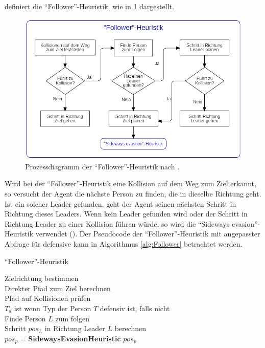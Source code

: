 \cite{Seitz.2016} definiert die "`Follower"'-Heuristik, wie in \figurename \ref{fig:followerHeuristik} dargestellt.
\begin{figure}[H]
	\centering
		\includegraphics[width=1.0\textwidth]{pictures/model/algorithm/heuristics/follower_heuristic.png}
	\caption{Prozessdiagramm der "`Follower"'-Heuristik nach \cite{Seitz.2016}.}
	\label{fig:followerHeuristik}
\end{figure}
Wird bei der "`Follower"'-Heuristik eine Kollision auf dem Weg zum Ziel erkannt, so versucht der Agent die nächste Person zu finden, die in dieselbe Richtung geht. Ist ein solcher Leader gefunden, geht der Agent seinen nächsten Schritt in Richtung dieses Leaders. Wenn kein Leader gefunden wird oder der Schritt in Richtung Leader zu einer Kollision führen würde, so wird die "`Sideways evasion"'-Heuristik verwendet (\cite{Seitz.2016}). Der Pseudocode der "`Follower"'-Heuristik mit angepasster Abfrage für defensive kann in Algorithmus \ref{alg:Follower} betrachtet werden.
\clearpage
\begin{algorithm} [H]
	\caption{"`Follower"'-Heuristik}
	\label{alg:Follower}
	
	\FollowerHeuristic{} {
		Zielrichtung bestimmen \\
		Direkter Pfad zum Ziel berechnen \\
		Pfad auf Kollisionen prüfen \\
		$T_d$ ist \True wenn Typ der Person $T$ defensiv ist, \False falls nicht \\
		 {
			Finde Person $L$ zum folgen \\
			 { 
				Schritt $pos_L$ in Richtung Leader $L$ berechnen \\
				 {
					$pos_p$ = \textbf{SidewaysEvasionHeuristic}
				} 
			} 
		} 
		\Return $pos_p$
	}
\end{algorithm}

